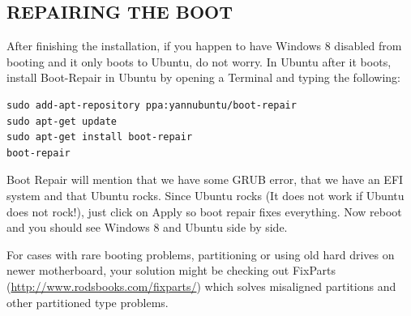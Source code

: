 \documentclass{../guide}
\begin{document}
\subsection{REPAIRING THE BOOT}
After finishing the installation, if you happen to have Windows 8 disabled from booting and it only boots to Ubuntu, do not worry. In Ubuntu after it boots, install Boot-Repair in Ubuntu by opening a Terminal and typing the following:

\begin{verbatim}
sudo add-apt-repository ppa:yannubuntu/boot-repair
sudo apt-get update
sudo apt-get install boot-repair
boot-repair
\end{verbatim}
Boot Repair will mention that we have some GRUB error, that we have an EFI system and that Ubuntu rocks. Since Ubuntu rocks (It does not work if Ubuntu does not rock!), just click on Apply so boot repair fixes everything. Now reboot and you should see Windows 8 and Ubuntu side by side.

For cases with rare booting problems, partitioning or using old hard drives on newer motherboard, your solution might be checking out FixParts (\url{http://www.rodsbooks.com/fixparts/}) which solves misaligned partitions and other partitioned type problems.
\end{document}
